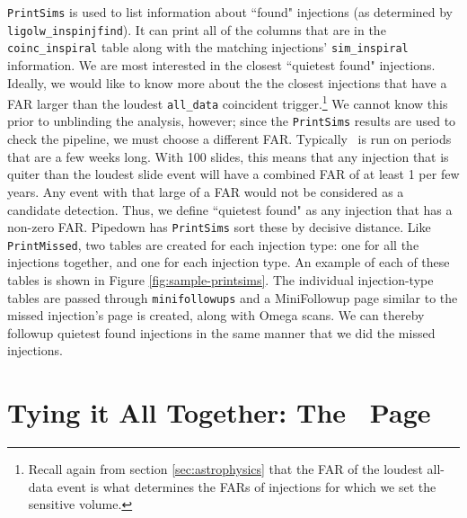 \texttt{PrintSims} is used to list information about ``found" injections (as determined
by \verb|ligolw_inspinjfind|). It can print all of the columns that are in the
\verb|coinc_inspiral| table along with the matching injections'
\verb|sim_inspiral| information. We are most interested in the closest
``quietest found" injections. Ideally, we would like to know more about the the
closest injections that have a \ac{FAR} larger than the loudest \verb|all_data|
coincident trigger.\footnote{Recall again from section \ref{sec:astrophysics}
that the \ac{FAR} of the loudest all-data event is what determines the
\acp{FAR} of injections for which we set the sensitive volume.} We cannot know
this prior to unblinding the analysis, however; since the \texttt{PrintSims} results are
used to check the pipeline, we must choose a different \ac{FAR}. Typically
\ihope~is run on periods that are a few weeks long. With 100 slides, this means
that any injection that is quiter than the loudest slide event will have a
combined \ac{FAR} of at least 1 per few years. Any event with that large of a
\ac{FAR} would not be considered as a candidate detection. Thus, we define
``quietest found" as any injection that has a non-zero \ac{FAR}. Pipedown has
\texttt{PrintSims} sort these by decisive distance. Like \texttt{PrintMissed}, two tables are
created for each injection type: one for all the injections together, and one
for each injection type. An example of each of these tables is shown in Figure
\ref{fig:sample-printsims}. The individual injection-type tables are passed
through \verb|minifollowups| and a MiniFollowup page similar to the missed
injection's page is created, along with Omega scans. We can thereby followup
quietest found injections in the same manner that we did the missed injections.

\section{Tying it All Together: The \ihope~Page}
\label{sec:ihope_page}

